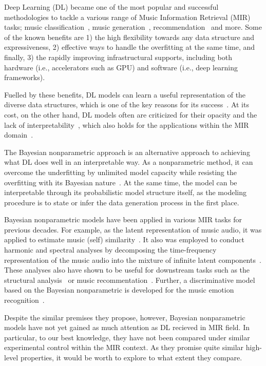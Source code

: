 \documentclass{article}
\begin{document}
Deep Learning (DL) became one of the most popular and successful methodologies to tackle a various range of Music Information Retrieval (MIR) tasks; music classification~\cite{musicclassification:book}, music generation~\cite{briot2019deep}, recommendation~\cite{10.3389/fams.2019.00044} and more. Some of the known benefits are 1) the high flexibility towards any data structure and expressiveness, 2) effective ways to handle the overfitting at the same time, and finally, 3) the rapidly improving infrastructural supports, including both hardware (i.e., accelerators such as GPU) and software (i.e., deep learning frameworks).

Fuelled by these benefits, DL models can learn a useful representation of the diverse data structures, which is one of the key reasons for its success~\cite{DBLP:conf/ismir/HumphreyBL12}. At its cost, on the other hand, DL models often are criticized for their opacity and the lack of interpretability~\cite{DBLP:conf/dsaa/GilpinBYBSK18}, which also holds for the applications within the MIR domain~\cite{DBLP:journals/tmm/Sturm14,DBLP:journals/cie/Sturm16}.

The Bayesian nonparametric approach is an alternative approach to achieving what DL does well in an interpretable way. As a nonparametric method, it can overcome the underfitting by unlimited model capacity while resisting the overfitting with its Bayesian nature~\cite{DBLP:reference/ml/Teh17}. At the same time, the model can be interpretable through its probabilistic model structure itself, as the modeling procedure is to state or infer the data generation process in the first place.

Bayesian nonparametric models have been applied in various MIR tasks for previous decades. For example, as the latent representation of music audio, it was applied to estimate music (self) similarity~\cite{DBLP:conf/icassp/QiPC07, DBLP:conf/ismir/HoffmanBC08}. It also was employed to conduct harmonic and spectral analyses by decomposing the time-frequency representation of the music audio into the mixture of infinite latent components~\cite{Hoffman09findinglatent, DBLP:conf/icassp/NakanoRKOS11}. These analyses also have shown to be useful for downstream tasks such as the structural analysis~\cite{DBLP:conf/icassp/NakanoOKMK12} or music recommentation~\cite{DBLP:conf/ismir/YoshiiG09}. Further, a discriminative model based on the Bayesian nonparametric is developed for the music emotion recognition~\cite{DBLP:journals/taffco/WangLCCH15}.

Despite the similar premises they propose, however, Bayesian nonparametric models have not yet gained as much attention as DL recieved in MIR field. In particular, to our best knowledge, they have not been compared under similar experimental control within the MIR context. As they promise quite similar high-level properties, it would be worth to explore to what extent they compare.
\end{document}
